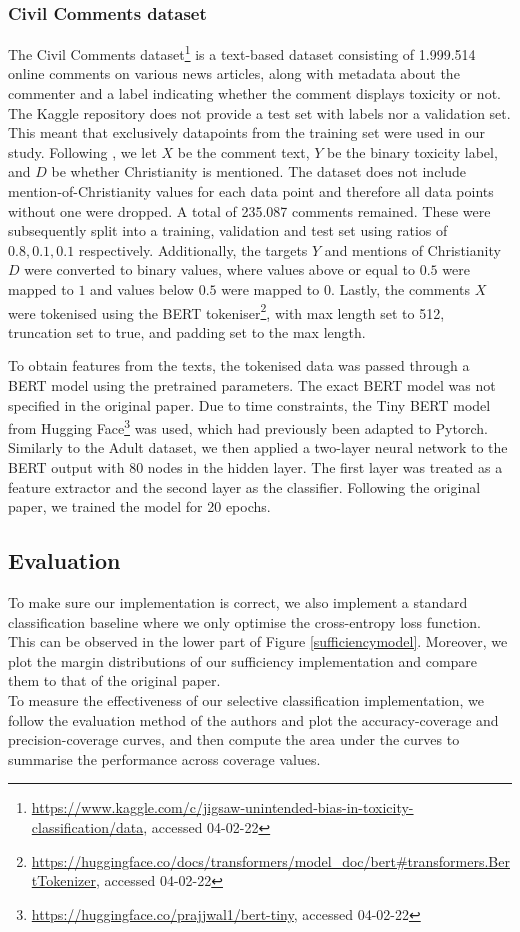 \subsubsection{Civil Comments dataset}
The Civil Comments dataset\footnote{\url{https://www.kaggle.com/c/jigsaw-unintended-bias-in-toxicity-classification/data}, accessed 04-02-22} \citep{borkan2019nuanced} is a text-based dataset consisting of 1.999.514 online comments on various news articles, along with metadata about the commenter and a label indicating whether the comment displays toxicity or not. The Kaggle repository does not provide a test set with labels nor a validation set. This meant that exclusively datapoints from the training set were used in our study. Following \citet{lee2021fair}, we let $X$ be the comment text, $Y$ be the binary toxicity label, and $D$ be whether Christianity is mentioned. The dataset does not include mention-of-Christianity values for each data point and therefore all data points without one were dropped. A total of 235.087 comments remained. These were subsequently split into a training, validation and test set using ratios of $0.8, 0.1, 0.1$ respectively. Additionally, the targets $Y$ and mentions of Christianity $D$ were converted to binary values, where values above or equal to $0.5$ were mapped to $1$ and values below $0.5$ were mapped to $0$. Lastly, the comments $X$ were tokenised using the BERT tokeniser\footnote{\url{https://huggingface.co/docs/transformers/model_doc/bert#transformers.BertTokenizer}, accessed 04-02-22}, with max length set to 512, truncation set to true, and padding set to the max length.

To obtain features from the texts, the tokenised data was passed through a BERT model \citep{devlin2018bert} using the pretrained parameters. The exact BERT model was not specified in the original paper. Due to time constraints, the Tiny BERT model from Hugging Face\footnote{\url{https://huggingface.co/prajjwal1/bert-tiny}, accessed 04-02-22} \citep{DBLP:journals/corr/abs-1908-08962, bhargava2021generalization} was used, which had previously been adapted to Pytorch. Similarly to the Adult dataset, we then applied a two-layer neural network to the BERT output with 80 nodes in the hidden layer. The first layer was treated as a feature extractor and the second layer as the classifier. Following the original paper, we trained the model for 20 epochs.

\subsection{Evaluation}
To make sure our implementation is correct, we also implement a standard classification baseline where we only optimise the cross-entropy loss function. This can be observed in the lower part of Figure \ref{sufficiencymodel}. Moreover, we plot the margin distributions of our sufficiency implementation and compare them to that of the original paper. \\
To measure the effectiveness of our selective classification implementation, we follow the evaluation method of the authors and plot the accuracy-coverage and precision-coverage curves, and then compute the area under the curves to summarise the performance across coverage values.

